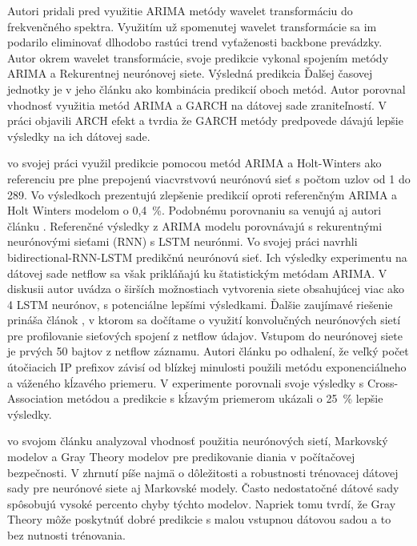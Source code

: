 \documentclass[thesismargins, thesislinespacing, openright, upjsfrontpage, combineabstracts]{rnthesis}
\begin{document}
Autori \cite{madan2018predicting,papagiannaki2005long} pridali pred využitie ARIMA metódy wavelet transformáciu do frekvenčného spektra. Využitím už spomenutej wavelet transformácie sa im podarilo eliminovať dlhodobo rastúci trend vyťaženosti backbone prevádzky. Autor \cite{madan2018predicting} okrem wavelet transformácie, svoje predikcie vykonal spojením metódy ARIMA a Rekurentnej neurónovej siete. Výsledná predikcia Ďalšej časovej jednotky je v jeho článku ako kombinácia predikcií oboch metód. Autor \cite{tang2016exploiting} porovnal vhodnosť využitia metód ARIMA a GARCH na dátovej sade zraniteľností. V práci objavili ARCH efekt a tvrdia že GARCH metódy predpovede dávajú lepšie výsledky na ich dátovej sade.

\cite{cortez2012multi} vo svojej práci využil predikcie pomocou metód ARIMA a Holt-Winters ako referenciu pre plne prepojenú viacvrstvovú neurónovú sieť s počtom uzlov od 1 do 289. Vo výsledkoch prezentujú zlepšenie predikcií oproti referenčným ARIMA a Holt Winters modelom o 0,4~\%. Podobnému porovnaniu sa venujú aj autori článku \cite{fang2019deep}. Referenčné výsledky z ARIMA modelu porovnávajú s rekurentnými neurónovými sieťami (RNN) s LSTM neurónmi. Vo svojej práci navrhli bidirectional-RNN-LSTM predikčnú neurónovú sieť. Ich výsledky experimentu na dátovej sade netflow sa však prikláňajú ku štatistickým metódam ARIMA. V diskusii autor uvádza o širších možnostiach vytvorenia siete obsahujúcej viac ako 4 LSTM neurónov, s potenciálne lepšími výsledkami. Ďalšie zaujímavé riešenie prináša článok \cite{millar2019using}, v ktorom sa dočítame o využití konvolučných neurónových sietí pre profilovanie sieťových spojení z netflow údajov. Vstupom do neurónovej siete je prvých 50 bajtov z netflow záznamu. Autori článku \cite{soldo2011blacklisting} po odhalení, že veľký počet útočiacich IP prefixov závisí od blízkej minulosti použili metódu exponenciálneho a váženého kĺzavého priemeru. V experimente porovnali svoje výsledky s Cross-Association metódou a predikcie s kĺzavým priemerom ukázali o 25~\% lepšie výsledky.

\cite{Leau2015} vo svojom článku analyzoval vhodnosť použitia neurónových sietí, Markovský modelov a Gray Theory modelov pre predikovanie diania v počítačovej bezpečnosti. V zhrnutí píše najmä o dôležitosti a robustnosti trénovacej dátovej sady pre neurónové siete aj Markovské modely. Často nedostatočné dátové sady spôsobujú vysoké percento chyby týchto modelov. Napriek tomu tvrdí, že Gray Theory môže poskytnúť dobré predikcie s malou vstupnou dátovou sadou a to bez nutnosti trénovania.
\end{document}
